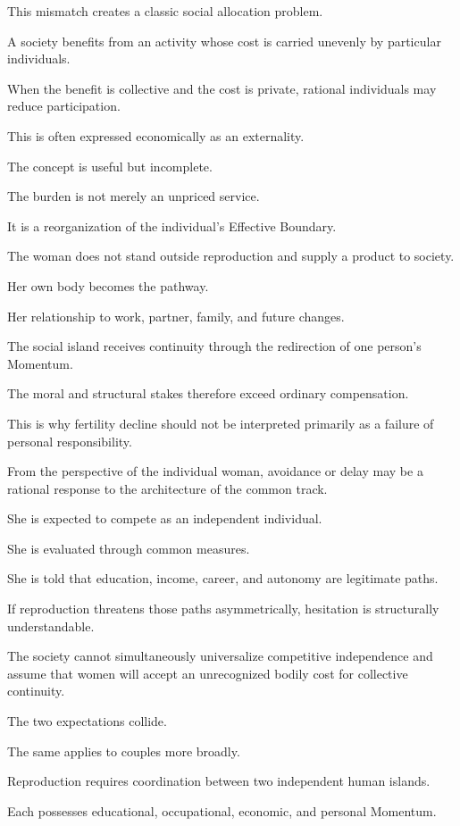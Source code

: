 This mismatch creates a classic social allocation problem.

A society benefits from an activity whose cost is carried unevenly by particular individuals.

When the benefit is collective and the cost is private, rational individuals may reduce participation.

This is often expressed economically as an externality.

The concept is useful but incomplete.

The burden is not merely an unpriced service.

It is a reorganization of the individual’s Effective Boundary.

The woman does not stand outside reproduction and supply a product to society.

Her own body becomes the pathway.

Her relationship to work, partner, family, and future changes.

The social island receives continuity through the redirection of one person’s Momentum.

The moral and structural stakes therefore exceed ordinary compensation.

This is why fertility decline should not be interpreted primarily as a failure of personal responsibility.

From the perspective of the individual woman, avoidance or delay may be a rational response to the architecture of the common track.

She is expected to compete as an independent individual.

She is evaluated through common measures.

She is told that education, income, career, and autonomy are legitimate paths.

If reproduction threatens those paths asymmetrically, hesitation is structurally understandable.

The society cannot simultaneously universalize competitive independence and assume that women will accept an unrecognized bodily cost for collective continuity.

The two expectations collide.

The same applies to couples more broadly.

Reproduction requires coordination between two independent human islands.

Each possesses educational, occupational, economic, and personal Momentum.

